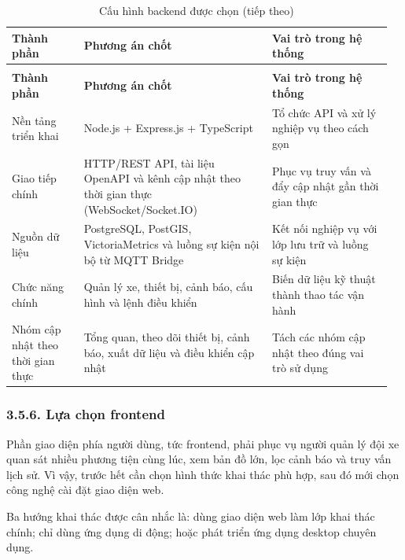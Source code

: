 \documentclass[a4paper]{extarticle}
\newcommand{\thesissettableid}[2]{%
  \renewcommand{\thetable}{#1}%
  \renewcommand{\theHtable}{#2}%
}
\begin{document}
{\thesissettableid{3.35}{condensed-bang-3-35-cau-hinh-backend-duoc-chon}
\def\LTcaptype{table}
\begin{longtable}{|L{0.184\linewidth}|L{0.474\linewidth}|L{0.3\linewidth}|}
\caption{Cấu hình backend được chọn}\label{tab:condensed-bang-3-35-cau-hinh-backend-duoc-chon}\\
\hline
\textbf{Thành phần} & \textbf{Phương án chốt} & \textbf{Vai trò trong hệ thống} \\
\hline
\endfirsthead
\caption[]{Cấu hình backend được chọn (tiếp theo)}\\
\hline
\textbf{Thành phần} & \textbf{Phương án chốt} & \textbf{Vai trò trong hệ thống} \\
\hline
\endhead
\endfoot
\endlastfoot
Nền tảng triển khai & Node.js + Express.js + TypeScript & Tổ chức API và xử lý nghiệp vụ theo cách gọn \\\hline
Giao tiếp chính & HTTP/REST API, tài liệu OpenAPI và kênh cập nhật theo thời gian thực (WebSocket/Socket.IO) & Phục vụ truy vấn và đẩy cập nhật gần thời gian thực \\\hline
Nguồn dữ liệu & PostgreSQL, PostGIS, VictoriaMetrics và luồng sự kiện nội bộ từ MQTT Bridge & Kết nối nghiệp vụ với lớp lưu trữ và luồng sự kiện \\\hline
Chức năng chính & Quản lý xe, thiết bị, cảnh báo, cấu hình và lệnh điều khiển & Biến dữ liệu kỹ thuật thành thao tác vận hành \\\hline
Nhóm cập nhật theo thời gian thực & Tổng quan, theo dõi thiết bị, cảnh báo, xuất dữ liệu và điều khiển cập nhật & Tách các nhóm cập nhật theo đúng vai trò sử dụng \\\hline
\end{longtable}
}

\subsubsection{3.5.6. Lựa chọn frontend}\label{lux1ef1a-chux1ecdn-frontend}

Phần giao diện phía người dùng, tức frontend, phải phục vụ người quản lý đội xe
quan sát nhiều phương tiện cùng lúc, xem bản đồ lớn, lọc cảnh báo và truy vấn
lịch sử. Vì vậy, trước hết cần chọn hình thức khai thác phù hợp, sau đó mới
chọn công nghệ cài đặt giao diện web.

Ba hướng khai thác được cân nhắc là: dùng giao diện web làm lớp khai thác chính;
chỉ dùng ứng dụng di động; hoặc phát triển ứng dụng desktop chuyên dụng.
\end{document}
